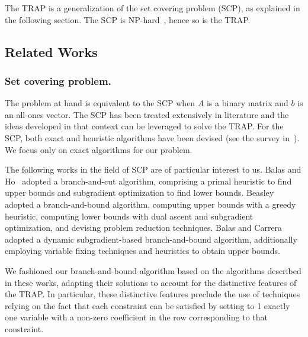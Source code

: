 \documentclass[runningheads]{llncs}
\begin{document}
The TRAP is a generalization of the set covering problem (SCP), as explained in the following section. The SCP is NP-hard~\cite{caprara-2000-algorithms}, hence so is the TRAP.

\subsection{Related Works}
\label{subsec:problem:related_works}

\subsubsection{Set covering problem.} The problem at hand is equivalent to the SCP when $A$ is a binary matrix and $b$ is an all-ones vector. The SCP has been treated extensively in literature and the ideas developed in that context can be leveraged to solve the TRAP. For the SCP, both exact and heuristic algorithms have been devised (see the survey in~\cite{caprara-2000-algorithms}). We focus only on exact algorithms for our problem. 


The following works in the field of SCP are of particular interest to us. Balas and Ho~\cite{balas-ho-2009-set-covering} adopted a branch-and-cut algorithm, comprising a primal heuristic to find upper bounds and subgradient optimization to find lower bounds.
Beasley~\cite{beasley-1987-algorithm} adopted a branch-and-bound algorithm, computing upper bounds with a greedy heuristic, computing lower bounds with dual ascent and subgradient optimization, and devising problem reduction techniques.
Balas and Carrera~\cite{balas-carrera-1996-dynamic} adopted a dynamic subgradient-based branch-and-bound algorithm, additionally employing variable fixing techniques and heuristics to obtain upper bounds.

We fashioned our branch-and-bound algorithm based on the algorithms described in these works, adapting their solutions to account for the distinctive features of the TRAP. In particular, these distinctive features preclude the use of techniques relying on the fact that each constraint can be satisfied by setting to 1 exactly one variable with a non-zero coefficient in the row corresponding to that constraint.
\end{document}
